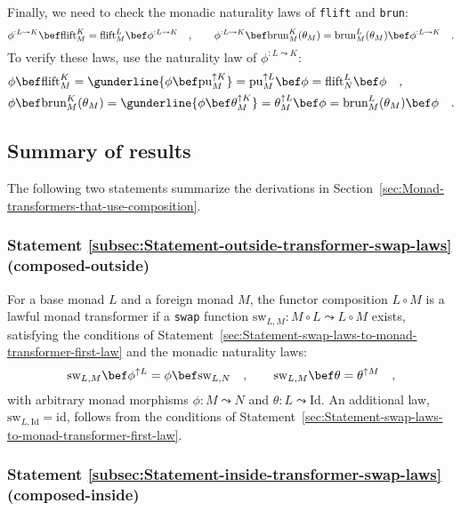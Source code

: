 Finally, we need to check the monadic naturality laws of \lstinline!flift!
and \lstinline!brun!:
\[
\phi^{:L\leadsto K}\bef\text{flift}_{M}^{K}=\text{flift}_{M}^{L}\bef\phi^{:L\leadsto K}\quad,\quad\quad\phi^{:L\leadsto K}\bef\text{brun}_{M}^{K}(\theta_{M})=\text{brun}_{M}^{L}(\theta_{M})\bef\phi^{:L\leadsto K}\quad.
\]
To verify these laws, use the naturality law of $\phi^{:L\leadsto K}$:
\begin{align*}
 & \phi\bef\text{flift}_{M}^{K}=\gunderline{\phi\bef\text{pu}_{M}^{\uparrow K}}=\text{pu}_{M}^{\uparrow L}\bef\phi=\text{flift}_{N}^{L}\bef\phi\quad,\\
 & \phi\bef\text{brun}_{M}^{K}(\theta_{M})=\gunderline{\phi\bef\theta_{M}^{\uparrow K}}=\theta_{M}^{\uparrow L}\bef\phi=\text{brun}_{M}^{L}(\theta_{M})\bef\phi\quad.
\end{align*}


\subsection{Summary of results}

The following two statements summarize the derivations in Section~\ref{sec:Monad-transformers-that-use-composition}.

\subsubsection{Statement \label{subsec:Statement-outside-transformer-swap-laws}\ref{subsec:Statement-outside-transformer-swap-laws}
(composed-outside)}

For a base monad $L$ and a foreign monad $M$, the functor composition
$L\circ M$ is a lawful monad transformer if a \lstinline!swap! function
$\text{sw}_{L,M}:M\circ L\leadsto L\circ M$ exists, satisfying the
conditions of Statement~\ref{sec:Statement-swap-laws-to-monad-transformer-first-law}
and the monadic naturality laws:
\[
\text{sw}_{L,M}\bef\phi^{\uparrow L}=\phi\bef\text{sw}_{L,N}\quad,\quad\quad\text{sw}_{L,M}\bef\theta=\theta^{\uparrow M}\quad,
\]
with arbitrary monad morphisms $\phi:M\leadsto N$ and $\theta:L\leadsto\text{Id}$.
An additional law, $\text{sw}_{L,\text{Id}}=\text{id}$, follows from
the conditions of Statement~\ref{sec:Statement-swap-laws-to-monad-transformer-first-law}.

\subsubsection{Statement \label{subsec:Statement-inside-transformer-swap-laws}\ref{subsec:Statement-inside-transformer-swap-laws}
(composed-inside)}

